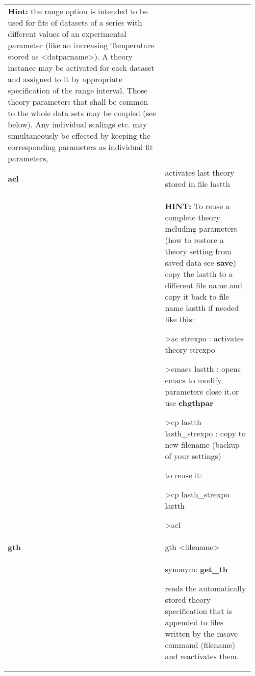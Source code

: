 \documentclass[]{article}
\begin{document}
\begin{longtable}[]{@{}ll@{}}
\begin{minipage}[t]{0.47\columnwidth}
\textbf{Hint:} the range option is intended to be used for fits of
datasets of a series with different values of an experimental parameter
(like an increasing Temperature stored as
\textless{}datparname\textgreater{}). A theory instance may be activated
for each dataset and assigned to it by appropriate specification of the
range interval. Those theory parameters that shall be common to the
whole data sets may be coupled (see below). Any individual scalings etc.
may simultaneously be effected by keeping the corresponding parameters
as individual fit parameters,\strut
\end{minipage}\tabularnewline
\textbf{acl} & activates last theory stored in file
lastth\tabularnewline
\begin{minipage}[t]{0.47\columnwidth}\raggedright
\strut
\end{minipage} & \begin{minipage}[t]{0.47\columnwidth}\raggedright
\textbf{HINT:} To reuse a complete theory including parameters (how to
restore a theory setting from saved data see \textbf{save}) copy the
lastth to a different file name and copy it back to file name lastth if
needed like this:

\textgreater{}ac strexpo : activates theory strexpo

\textgreater{}emacs lastth : opens emacs to modify parameters close
it.or use \textbf{chgthpar}

\textgreater{}cp lastth lasth\_strexpo : copy to new filename (backup of
your settings)

to reuse it:

\textgreater{}cp lasth\_strexpo lastth

\textgreater{}acl\strut
\end{minipage}\tabularnewline
\textbf{gth} & gth \textless{}filename\textgreater{}\tabularnewline
\begin{minipage}[t]{0.47\columnwidth}\raggedright
\strut
\end{minipage} & \begin{minipage}[t]{0.47\columnwidth}\raggedright
synonym: \textbf{get\_th}

reads the automatically stored theory specification that is appended to
files written by the msave command (filename) and reactivates them.


\end{minipage}
\end{longtable}
\end{document}
